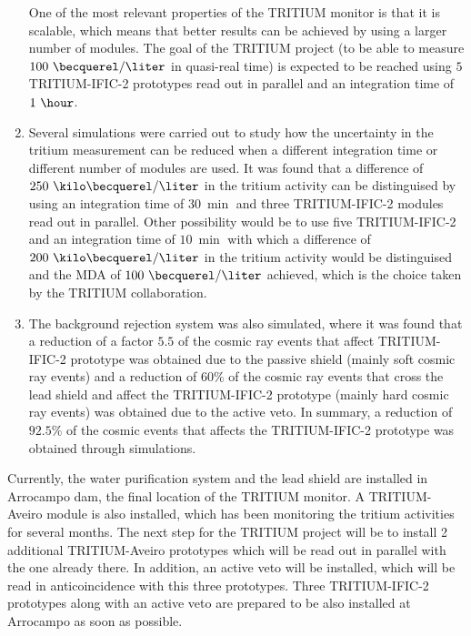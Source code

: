 \begin{enumerate}
One of the most relevant properties of the TRITIUM monitor is that it is scalable, which means that better results can be achieved by using a larger number of modules. The goal of the TRITIUM project (to be able to measure $100~\becquerel/\liter$ in quasi-real time) is expected to be reached using $5$ TRITIUM-IFIC-2 prototypes read out in parallel and an integration time of $1~\hour$.

\item{} Several simulations were carried out to study how the uncertainty in the tritium measurement can be reduced when a different integration time or different number of modules are used. It was found that a difference of $250~\kilo\becquerel/\liter$ in the tritium activity can be distinguised by using an integration time of $30~\min$ and three TRITIUM-IFIC-2 modules read out in parallel. Other possibility would be to use five TRITIUM-IFIC-2 and an integration time of $10~\min$ with which a difference of $200~\kilo\becquerel/\liter$ in the tritium activity would be distinguised and the MDA of $100~\becquerel/\liter$ achieved, which is the choice taken by the TRITIUM collaboration.

\item{} The background rejection system was also simulated, where it was found that a reduction of a factor $5.5$ of the cosmic ray events that affect TRITIUM-IFIC-2 prototype was obtained due to the passive shield (mainly soft cosmic ray events) and a reduction of $60\%$ of the cosmic ray events that cross the lead shield and affect the TRITIUM-IFIC-2 prototype (mainly hard cosmic ray events) was obtained due to the active veto. In summary, a reduction of $92.5\%$ of the cosmic events that affects the TRITIUM-IFIC-2 prototype was obtained through simulations.

\end{enumerate}

Currently, the water purification system and the lead shield are installed in Arrocampo dam, the final location of the TRITIUM monitor. A TRITIUM-Aveiro module is also installed, which has been monitoring the tritium activities for several months. The next step for the TRITIUM project will be to install 2 additional TRITIUM-Aveiro prototypes which will be read out in parallel with the one already there. In addition, an active veto will be installed, which will be read in anticoincidence with this three prototypes. Three TRITIUM-IFIC-2 prototypes along with an active veto are prepared to be also installed at Arrocampo as soon as possible.


